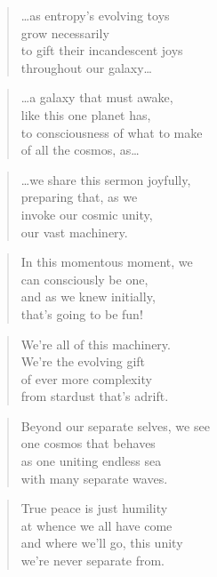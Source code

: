 \documentclass[14pt,a4paper]{article}
\begin{document}
\begin{verse}
…as entropy’s evolving toys\\
grow necessarily\\
to gift their incandescent joys\\
throughout our galaxy…
\end{verse}

\begin{verse}
…a galaxy that must awake,\\
like this one planet has,\\
to consciousness of what to make\\
of all the cosmos, as…
\end{verse}

\begin{verse}
…we share this sermon joyfully,\\
preparing that, as we\\
invoke our cosmic unity,\\
our vast machinery.
\end{verse}

\begin{verse}
In this momentous moment, we\\
can consciously be one,\\
and as we knew initially,\\
that’s going to be fun!
\end{verse}

\begin{verse}
We’re all of this machinery.\\
We’re the evolving gift\\
of ever more complexity\\
from stardust that’s adrift.
\end{verse}

\begin{verse}
Beyond our separate selves, we see\\
one cosmos that behaves\\
as one uniting endless sea\\
with many separate waves.
\end{verse}

\begin{verse}
True peace is just humility\\
at whence we all have come\\
and where we’ll go, this unity\\
we’re never separate from.
\end{verse}
\end{document}
